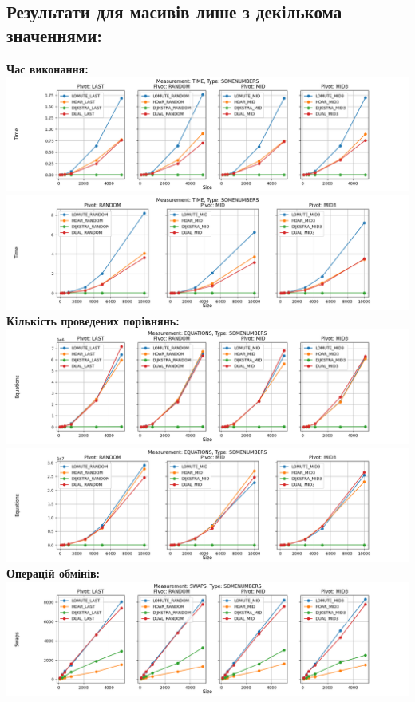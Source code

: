 \documentclass{article}
\begin{document}
    \subsection{Результати для масивів лише з декількома значеннями:}
    \textbf{Час виконання:}
    \newline
        \includegraphics[scale=0.5]{somenumbers_Time_6_numbers.png}
        \includegraphics[scale=0.5]{somenumbers_Time_3_pivots_7_numbers.png}
    \textbf{Кiлькiсть проведених порiвнянь:}
    \newline
        \includegraphics[scale=0.5]{somenumbers_Equations_6_numbers.png}
        \includegraphics[scale=0.5]{somenumbers_Equations_3_pivots_7_numbers.png}
        \newline
    \textbf{Операцiй обмінів:}
    \newline
        \includegraphics[scale=0.5]{somenumbers_Swaps_6_numbers.png}
\end{document}
